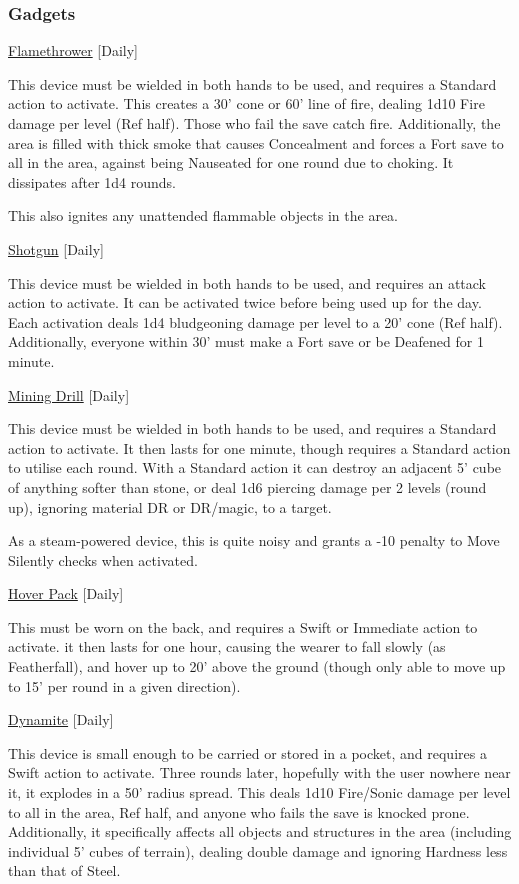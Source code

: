 \subsubsection{Gadgets}

\noindent\underline{Flamethrower} [Daily]

\noindent This device must be wielded in both hands to be used, and requires a Standard action to activate. This creates a 30' cone or 60' line of fire, dealing 1d10 Fire damage per level (Ref half). Those who fail the save catch fire. Additionally, the area is filled with thick smoke that causes Concealment and forces a Fort save to all in the area, against being Nauseated for one round due to choking. It dissipates after 1d4 rounds.

\smallskip\noindent This also ignites any unattended flammable objects in the area.

\medskip\noindent\underline{Shotgun} [Daily]

\noindent This device must be wielded in both hands to be used, and requires an attack action to activate. It can be activated twice before being used up for the day. Each activation deals 1d4 bludgeoning damage per level to a 20' cone (Ref half). Additionally, everyone within 30' must make a Fort save or be Deafened for 1 minute.

\medskip\noindent\underline{Mining Drill} [Daily]

\noindent This device must be wielded in both hands to be used, and requires a Standard action to activate. It then lasts for one minute, though requires a Standard action to utilise each round. With a Standard action it can destroy an adjacent 5' cube of anything softer than stone, or deal 1d6 piercing damage per 2 levels (round up), ignoring material DR or DR/magic, to a target.

\smallskip\noindent As a steam-powered device, this is quite noisy and grants a -10 penalty to Move Silently checks when activated.

\medskip\noindent\underline{Hover Pack} [Daily]

\noindent This must be worn on the back, and requires a Swift or Immediate action to activate. it then lasts for one hour, causing the wearer to fall slowly (as Featherfall), and hover up to 20' above the ground (though only able to move up to 15' per round in a given direction).

\medskip\noindent\underline{Dynamite} [Daily]

\noindent This device is small enough to be carried or stored in a pocket, and requires a Swift action to activate. Three rounds later, hopefully with the user nowhere near it, it explodes in a 50' radius spread. This deals 1d10 Fire/Sonic damage per level to all in the area, Ref half, and anyone who fails the save is knocked prone. Additionally, it specifically affects all objects and structures in the area (including individual 5' cubes of terrain), dealing double damage and ignoring Hardness less than that of Steel.

